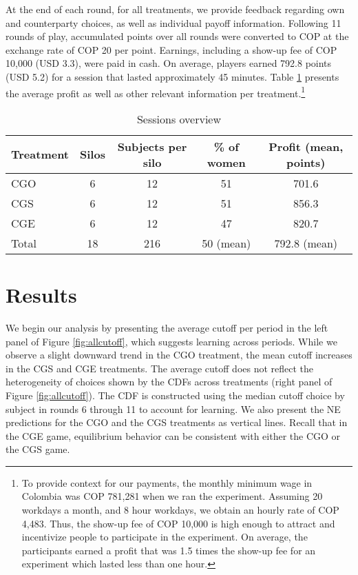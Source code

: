 \documentclass[12pt, letterpaper]{article}
\theoremstyle{plain}
\begin{document}
At the end of each round, for all treatments, we provide feedback regarding own and counterparty choices, as well as individual payoff information. Following 11 rounds of play, accumulated points over all rounds were converted to COP at the exchange rate of COP 20 per point. Earnings, including a show-up fee of COP 10,000 (USD 3.3), were paid in cash. On average, players earned 792.8 points (USD 5.2) for a session that lasted approximately 45 minutes. Table \ref{session} presents the average profit as well as other relevant information per treatment.\footnote{To provide context for our payments, the monthly minimum wage in Colombia was COP 781,281 when we ran the experiment. Assuming 20 workdays a month, and 8 hour workdays, we obtain an hourly rate of COP 4,483. Thus, the show-up fee of COP 10,000 is high enough to attract and incentivize people to participate in the experiment. On average, the participants earned a profit that was 1.5 times the show-up fee for an experiment which lasted less than one hour.} 
\begin{table}[ht]
\centering
\caption{Sessions overview }
\hline
\begin{tabular}{lcccc}
  Treatment & Silos & Subjects per silo & \% of women & Profit (mean, points)\\
  \hline  
  CGO & 6 & 12 & 51 & 701.6 \\
  CGS & 6 & 12 & 51 & 856.3 \\
  CGE & 6 & 12 & 47 & 820.7 \\
\hline
Total & 18 & 216 &  50 (mean) & 792.8 (mean)\\
\end{tabular}

\label{session}
\end{table}

\section{Results}
\label{sec:results}

We begin our analysis by presenting the average cutoff per period in the left panel of Figure \ref{fig:allcutoff}, which suggests learning across periods. While we observe a slight downward trend in the CGO treatment, the mean cutoff increases in the CGS and CGE treatments. The average cutoff does not reflect the heterogeneity of choices shown by the CDFs across treatments (right panel of Figure \ref{fig:allcutoff}). The CDF is constructed using the median cutoff choice by subject in rounds 6 through 11 to account for learning. We also present the NE predictions for the CGO and the CGS treatments as vertical lines. Recall that in the CGE game, equilibrium behavior can be consistent with either the CGO or the CGS game. \\
\end{document}

